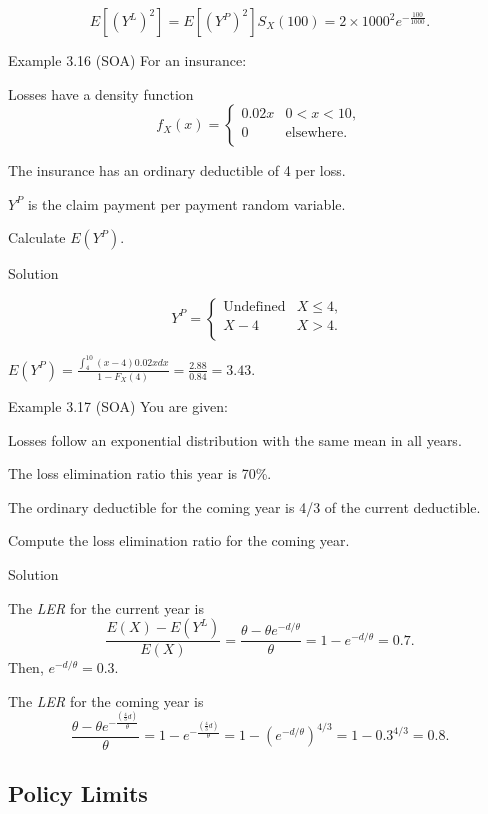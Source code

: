\documentclass[]{book}
\theoremstyle{definition}
\theoremstyle{definition}
\theoremstyle{definition}
\theoremstyle{remark}
\begin{document}
\[E\left\lbrack \left( Y^{L} \right)^{2} \right\rbrack = E\left\lbrack \left( Y^{P} \right)^{2} \right\rbrack S_{X}\left( 100 \right) = 2 \times 1000^{2}e^{- \frac{100}{1000}}.\]

Example 3.16 (SOA) For an insurance:

Losses have a density function
\[f_{X}\left( x \right) = \left\{ \begin{matrix}
    0.02x & 0 < x  < 10, \\
    0 & \text{elsewhere.} \\
    \end{matrix} \right. \]

The insurance has an ordinary deductible of 4 per loss.

\(Y^{P}\) is the claim payment per payment random variable.

Calculate \(E\left( Y^{P} \right)\).

Solution

\[Y^{P} = \left\{ \begin{matrix}
\text{Undefined} & X \leq 4, \\
X - 4 & X > 4. \\
\end{matrix} \right.\ \]

\(E\left( Y^{P} \right) = \frac{\int_{4}^{10}\left( x - 4 \right)0.02xdx}{{1 - F}_{X}\left( 4 \right)} = \frac{2.88}{0.84} = 3.43\).

Example 3.17 (SOA) You are given:

Losses follow an exponential distribution with the same mean in all
years.

The loss elimination ratio this year is 70\%.

The ordinary deductible for the coming year is 4/3 of the current
deductible.

Compute the loss elimination ratio for the coming year.

Solution

The \emph{LER} for the current year is
\[\frac{E\left( X \right) - E\left( Y^{L} \right)}{E\left( X \right)} = \frac{\theta - \theta e^{- d / \theta}}{\theta} = 1 - e^{- d / \theta} = 0.7.\]
Then, \(e^{- d / \theta} = 0.3\).

The \emph{LER} for the coming year is
\[ \frac{\theta - \theta e^{- \frac{\left( \frac{4}{3}d \right)}{\theta}}}{\theta} = 1 - e^{- \frac{\left( \frac{4}{3} d \right)}{\theta}} = 1 - \left( e^{-d /\theta} \right)^{4/3} = 1 - {0.3}^{4/3} = 0.8 .\]

\subsection{Policy Limits}\label{PolicyLimits}
\end{document}
